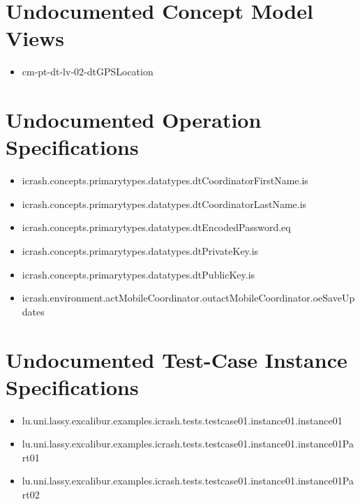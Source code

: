 \section[Undocumented Concept Model Views]{Undocumented Concept Model Views}
\begin{itemize}
\item cm-pt-dt-lv-02-dtGPSLocation 
\end{itemize}


\section[Undocumented Operation Specifications]{Undocumented Operation Specifications}
\begin{itemize}
\item icrash.concepts.primarytypes.datatypes.dtCoordinatorFirstName.is 
\item icrash.concepts.primarytypes.datatypes.dtCoordinatorLastName.is 
\item icrash.concepts.primarytypes.datatypes.dtEncodedPassword.eq 
\item icrash.concepts.primarytypes.datatypes.dtPrivateKey.is 
\item icrash.concepts.primarytypes.datatypes.dtPublicKey.is 
\item icrash.environment.actMobileCoordinator.outactMobileCoordinator.oeSaveUpdates 
\end{itemize}





\section[Undocumented Test-Case Instance Specifications]{Undocumented Test-Case Instance Specifications}
\begin{itemize}
\item lu.uni.lassy.excalibur.examples.icrash.tests.testcase01.instance01.instance01 
\item lu.uni.lassy.excalibur.examples.icrash.tests.testcase01.instance01.instance01Part01 
\item lu.uni.lassy.excalibur.examples.icrash.tests.testcase01.instance01.instance01Part02 
\end{itemize}



